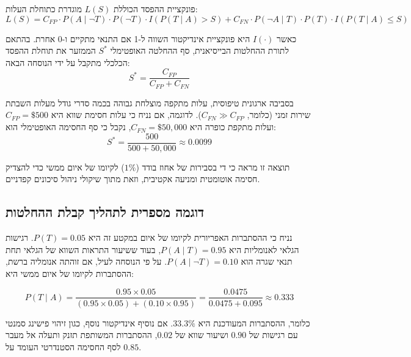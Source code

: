 \documentclass[11pt,a4paper]{article}
\begin{document}
פונקציית ההפסד הכוללת $L(S)$ מוגדרת כתוחלת העלות:
\begin{equation}
L(S) = C_{FP} \cdot P(A \mid \neg T) \cdot P(\neg T) \cdot I(P(T \mid A) > S) + C_{FN} \cdot P(\neg A \mid T) \cdot P(T) \cdot I(P(T \mid A) \le S)
\end{equation}

כאשר $I(\cdot)$ היא פונקציית אינדיקטור השווה ל-1 אם התנאי מתקיים ו-0 אחרת. בהתאם לתורת ההחלטות הבייסיאנית, סף ההחלטה האופטימלי $S^*$ הממזער את תוחלת ההפסד הכלכלי מתקבל על ידי הנוסחה הבאה:
\begin{equation}
S^* = \frac{C_{FP}}{C_{FP} + C_{FN}}
\label{eq:optimal_threshold}
\end{equation}

בסביבה ארגונית טיפוסית, עלות מתקפה מוצלחת גבוהה בכמה סדרי גודל מעלות השבתת שירות זמני (כלומר, $C_{FN} \gg C_{FP}$). לדוגמה, אם נניח כי עלות חסימת שווא היא $C_{FP} = \$500$ ועלות מתקפת כופרה היא $C_{FN} = \$50,000$, נקבל כי סף החסימה האופטימלי הוא:
\begin{equation}
S^* = \frac{500}{500 + 50,000} \approx 0.0099
\end{equation}

תוצאה זו מראה כי די בסבירות של אחוז בודד ($1\%$) לקיומו של איום ממשי כדי להצדיק חסימה אוטומטית ומניעה אקטיבית, וזאת מתוך שיקולי ניהול סיכונים קפדניים.

\subsection{דוגמה מספרית לתהליך קבלת ההחלטות}
נניח כי ההסתברות האפריורית לקיומו של איום במקטע זה היא $P(T) = 0.05$. רגישות הגלאי לאנומליות היא $P(A \mid T) = 0.95$, בעוד ששיעור התראות השווא של הגלאי תחת תנאי שגרה הוא $P(A \mid \neg T) = 0.10$. 
על פי הנוסחה לעיל, אם זוהתה אנומליה ברשת, ההסתברות לקיומו של איום ממשי היא:

\begin{equation}
P(T \mid A) = \frac{0.95 \times 0.05}{(0.95 \times 0.05) + (0.10 \times 0.95)} = \frac{0.0475}{0.0475 + 0.095} \approx 0.333
\end{equation}

כלומר, ההסתברות המעודכנת היא $33.3\%$. אם נוסיף אינדיקטור נוסף, כגון זיהוי פישינג סמנטי עם רגישות של $0.90$ ושיעור שווא של $0.02$, ההסתברות המשותפת תזנק ותעלה אל מעבר לסף החסימה הסטנדרטי העומד על $0.85$.

\end{document}
